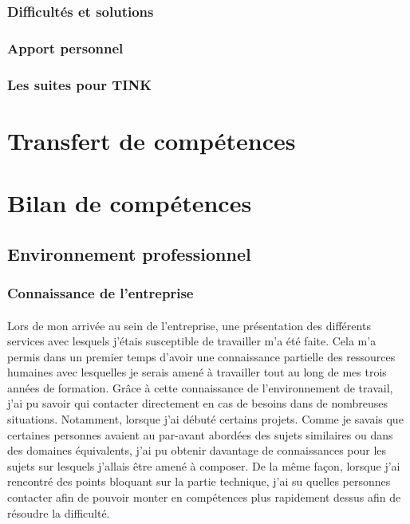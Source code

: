 \documentclass[12pt,a4paper]{report}
\begin{document}
\subsubsection{Difficultés et solutions}
\subsubsection{Apport personnel}
\subsubsection{Les suites pour TINK}


\newpage
\section{Transfert de compétences}

\newpage
\section{Bilan de compétences} 
\subsection{Environnement professionnel}
\subsubsection{Connaissance de l'entreprise}
\paragraph*{}Lors de mon arrivée au sein de l'entreprise, une présentation des différents services avec lesquels j'étais susceptible de travailler m'a été faite. Cela m'a permis dans un premier temps d'avoir une connaissance partielle des ressources humaines avec lesquelles je serais amené à travailler tout au long de mes trois années de formation. Grâce à cette connaissance de l'environnement de travail, j'ai pu savoir qui contacter directement en cas de besoins dans de nombreuses situations. Notamment, lorsque j'ai débuté certains projets. Comme je savais que certaines personnes avaient au par-avant abordées des sujets similaires ou dans des domaines équivalents, j'ai pu obtenir davantage de connaissances pour les sujets sur lesquels j'allais être amené à composer. De la même façon, lorsque j'ai rencontré des points bloquant sur la partie technique, j'ai su quelles personnes contacter afin de pouvoir monter en compétences plus rapidement dessus afin de résoudre la difficulté.
\end{document}
